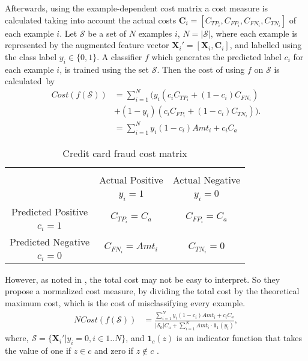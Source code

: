 	Afterwards, using the example-dependent cost matrix a cost measure is calculated taking into 
	account the actual costs \mbox{$\mathbf{C}_i=[C_{TP_i},C_{FP_i},C_{FN_i},C_{TN_i}]$} of each 
	example $i$. Let $\mathcal{S}$ be a set of $N$ examples $i$, $N=\vert \mathcal{S} \vert$, where 
	each example is represented by the augmented feature vector \mbox{$\mathbf{X}_i'=[\mathbf{X}_i, 
	\mathbf{C}_i]$}, and labelled using the class label $y_i \in \{0,1\}$. A classifier $f$ which 
	generates the predicted label $c_i$ for each example $i$, is trained using the set $\mathcal{S}$. 
	Then the cost of using $f$ on $\mathcal{S}$ is \mbox{calculated by}
  \begin{align}
    Cost(f(\mathcal{S})) &= \sum_{i=1}^{N} \bigg( y_i(c_i C_{TP_i} + (1-c_i)C_{FN_i})  \nonumber\\ 
    & +(1-y_i)(c_i C_{FP_i} + (1-c_i)C_{TN_i}) \bigg). \nonumber \\
	  &=  \sum_{i=1}^{N} y_i(1-c_i)Amt_i + c_iC_a
  \end{align} \label{eq:cost}

	\begin{table}[t]
		\caption{Credit card fraud cost matrix \citep{CorreaBahnsen2013}}
		\centering
		\begin{tabular}{c | c | c }
		\multicolumn{3}{c}{}\\
			\multicolumn{1}{c|}{}  & Actual Positive& Actual Negative \\
			\multicolumn{1}{c|}{} & $y_i=1$& $y_i=0$ \\
			\hline
			Predicted Positive 		& \multirow{ 2}{*}{$C_{TP_i}=C_a$} & \multirow{ 2}{*}{$C_{FP_i}=C_a$} 
			\\
			$c_i=1$ & &\\
			\hline
			Predicted Negative  	& \multirow{ 2}{*}{$C_{FN_i}=Amt_i$} & \multirow{ 
			2}{*}{$C_{TN_i}=0$} \\
			$c_i=0$ & &\\
		\end{tabular}
		\label{tab:table_costmat_fraud}
	\end{table}
	  
	However, as noted in \citep{Whitrow2008}, the total cost may not be easy to interpret. So they 
	propose a normalized cost measure, by dividing the total cost by the theoretical maximum cost, 
	which is the cost of misclassifying every example.
  \begin{align}
    NCost(f(\mathcal{S})) &= \frac{\sum_{i=1}^{N} y_i(1-c_i)Amt_i + c_iC_a}
							{\vert \mathcal{S}_0 \vert C_a + \sum_{i=1}^{N}Amt_i\cdot \mathbf{1}_1(y_i)},
  \end{align} \label{eq:ncost}
  where, $\mathcal{S}=\{\mathbf{X}_i'|y_i=0,i \in 1..N\}$, and $\mathbf{1}_c(z)$ is an 
	indicator function that takes the value of one if $z \in c$ and zero if $z \notin c$ .

